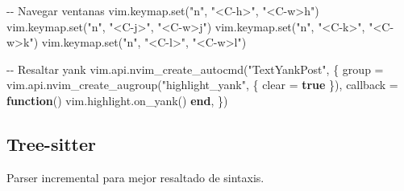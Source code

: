 \documentclass[
  doc,
  floatsintext,
  longtable,
  a4paper,
  nolmodern,
  notxfonts,
  notimes,
  12pt,
  colorlinks=true,linkcolor=blue,citecolor=blue,urlcolor=blue]{apa7}
\newenvironment{Shaded}{\begin{snugshade}}{\end{snugshade}}
\newcommand{\CommentTok}[1]{\textcolor[rgb]{0.37,0.37,0.37}{#1}}
\newcommand{\KeywordTok}[1]{\textcolor[rgb]{0.00,0.23,0.31}{\textbf{#1}}}
\newcommand{\NormalTok}[1]{\textcolor[rgb]{0.00,0.23,0.31}{#1}}
\newcommand{\OperatorTok}[1]{\textcolor[rgb]{0.37,0.37,0.37}{#1}}
\newcommand{\StringTok}[1]{\textcolor[rgb]{0.13,0.47,0.30}{#1}}
\newcommand{\VariableTok}[1]{\textcolor[rgb]{0.07,0.07,0.07}{#1}}
\begin{document}
\begin{Shaded}
\begin{Highlighting}[]
\CommentTok{{-}{-} Navegar ventanas}
\VariableTok{vim}\OperatorTok{.}\VariableTok{keymap}\OperatorTok{.}\NormalTok{set}\OperatorTok{(}\StringTok{"n"}\OperatorTok{,} \StringTok{"\textless{}C{-}h\textgreater{}"}\OperatorTok{,} \StringTok{"\textless{}C{-}w\textgreater{}h"}\OperatorTok{)}
\VariableTok{vim}\OperatorTok{.}\VariableTok{keymap}\OperatorTok{.}\NormalTok{set}\OperatorTok{(}\StringTok{"n"}\OperatorTok{,} \StringTok{"\textless{}C{-}j\textgreater{}"}\OperatorTok{,} \StringTok{"\textless{}C{-}w\textgreater{}j"}\OperatorTok{)}
\VariableTok{vim}\OperatorTok{.}\VariableTok{keymap}\OperatorTok{.}\NormalTok{set}\OperatorTok{(}\StringTok{"n"}\OperatorTok{,} \StringTok{"\textless{}C{-}k\textgreater{}"}\OperatorTok{,} \StringTok{"\textless{}C{-}w\textgreater{}k"}\OperatorTok{)}
\VariableTok{vim}\OperatorTok{.}\VariableTok{keymap}\OperatorTok{.}\NormalTok{set}\OperatorTok{(}\StringTok{"n"}\OperatorTok{,} \StringTok{"\textless{}C{-}l\textgreater{}"}\OperatorTok{,} \StringTok{"\textless{}C{-}w\textgreater{}l"}\OperatorTok{)}

\CommentTok{{-}{-} Resaltar yank}
\VariableTok{vim}\OperatorTok{.}\VariableTok{api}\OperatorTok{.}\NormalTok{nvim\_create\_autocmd}\OperatorTok{(}\StringTok{"TextYankPost"}\OperatorTok{,} \OperatorTok{\{}
    \VariableTok{group} \OperatorTok{=} \VariableTok{vim}\OperatorTok{.}\VariableTok{api}\OperatorTok{.}\NormalTok{nvim\_create\_augroup}\OperatorTok{(}\StringTok{"highlight\_yank"}\OperatorTok{,} \OperatorTok{\{} \VariableTok{clear} \OperatorTok{=} \KeywordTok{true} \OperatorTok{\}),}
    \VariableTok{callback} \OperatorTok{=} \KeywordTok{function}\OperatorTok{()}
        \VariableTok{vim}\OperatorTok{.}\VariableTok{highlight}\OperatorTok{.}\NormalTok{on\_yank}\OperatorTok{()}
    \KeywordTok{end}\OperatorTok{,}
\OperatorTok{\})}
\end{Highlighting}
\end{Shaded}

\subsection{Tree-sitter}\label{tree-sitter}

Parser incremental para mejor resaltado de sintaxis.
\end{document}
